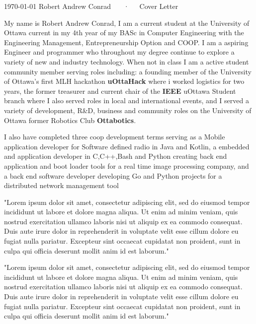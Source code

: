 \documentclass[11pt, a4paper]{awesome-cv}
\begin{document}
\makecvheader[R]

\makecvfooter
  {\today}
  {Robert Andrew Conrad ~~~·~~~Cover Letter}
  {}

\makelettertitle

\begin{cvletter}


My name is Robert Andrew Conrad, I am a current student at the University of Ottawa current in my 4th year of my BASc in Computer Engineering with the Engineering Management, Entrepreneurship Option and COOP. I am a aspiring Engineer and programmer who throughout my degree continue to explore a variety of new and industry technology. When not in class I am a active student community member serving roles including: a founding member of the University of Ottawa's first MLH hackathon \textbf{uOttaHack} where i worked logistics for two years, the former treasurer and current chair of the \textbf{IEEE} uOttawa Student branch where I also served roles in local and international events, and I served a variety of development, R&D, business and community roles on the University of Ottawa former Robotics Club \textbf{Ottabotics}.

I also have completed three coop development terms serving as a Mobile application developer for Software defined radio in Java and Kotlin, a embedded and application developer in C,C++,Bash and Python creating back end application and boot loader tools for a real time image processing company, and a back end software developer developing Go and Python projects for a distributed network management tool 

"Lorem ipsum dolor sit amet, consectetur adipiscing elit, sed do eiusmod tempor incididunt ut labore et dolore magna aliqua. Ut enim ad minim veniam, quis nostrud exercitation ullamco laboris nisi ut aliquip ex ea commodo consequat. Duis aute irure dolor in reprehenderit in voluptate velit esse cillum dolore eu fugiat nulla pariatur. Excepteur sint occaecat cupidatat non proident, sunt in culpa qui officia deserunt mollit anim id est laborum."

"Lorem ipsum dolor sit amet, consectetur adipiscing elit, sed do eiusmod tempor incididunt ut labore et dolore magna aliqua. Ut enim ad minim veniam, quis nostrud exercitation ullamco laboris nisi ut aliquip ex ea commodo consequat. Duis aute irure dolor in reprehenderit in voluptate velit esse cillum dolore eu fugiat nulla pariatur. Excepteur sint occaecat cupidatat non proident, sunt in culpa qui officia deserunt mollit anim id est laborum."

\end{cvletter}


\makeletterclosing
\end{document}
